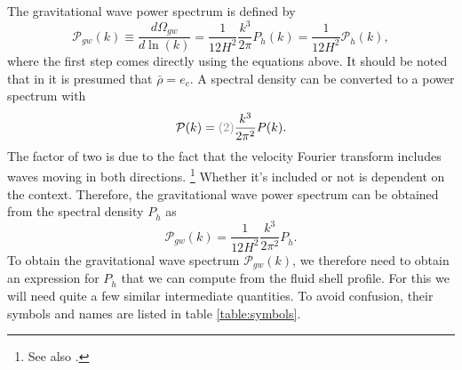 The gravitational wave power spectrum is defined by
\cite[eq. 3.45]{hindmarsh_gw_pt_2019}
\begin{equation}
\mathcal{P}_{gw}(k)
\equiv \frac{d \Omega_{gw}}{d \ln (k)}
= \frac{1}{12 H^2} \frac{k^3}{2\pi} P_{\dot{h}}(k)
= \frac{1}{12 H^2} \mathcal{P}_{\dot{h}}(k),
\label{eq:gw_pow_spec}
\end{equation}
where the first step comes directly using the equations above.
It should be noted that in \cite[eq. 3.6, eq. 3.46]{hindmarsh_gw_pt_2019} it is presumed that $\bar{\rho}=e_c$.
A spectral density can be converted to a power spectrum with
\cite[eq. 4.18]{hindmarsh_gw_pt_2019}
\begin{equation}
\mathcal{P}(k) = \textcolor{gray}{(2)} \frac{k^3}{2 \pi^2} P(k).
\label{eq:pow_spec}
\end{equation}
The factor of two is due to the fact that the velocity Fourier transform includes waves moving in both directions.
\footnote{See also \cite[p. 338]{maggiore_gw_2008}.}
Whether it's included or not is dependent on the context.
Therefore, the gravitational wave power spectrum can be obtained from the spectral density $P_\dot{h}$ as
\begin{equation}
\mathcal{P}_{gw}(k) = \frac{1}{12 H^2} \frac{k^3}{2\pi^2} P_{\dot{h}}.
\label{eq:gw_pow_spec2}
\end{equation}
To obtain the gravitational wave spectrum $\mathcal{P}_{gw}(k)$,
we therefore need to obtain an expression for $P_\dot{h}$ that we can compute from the fluid shell profile.
For this we will need quite a few similar intermediate quantities.
To avoid confusion, their symbols and names are listed in table \ref{table:symbols}.

